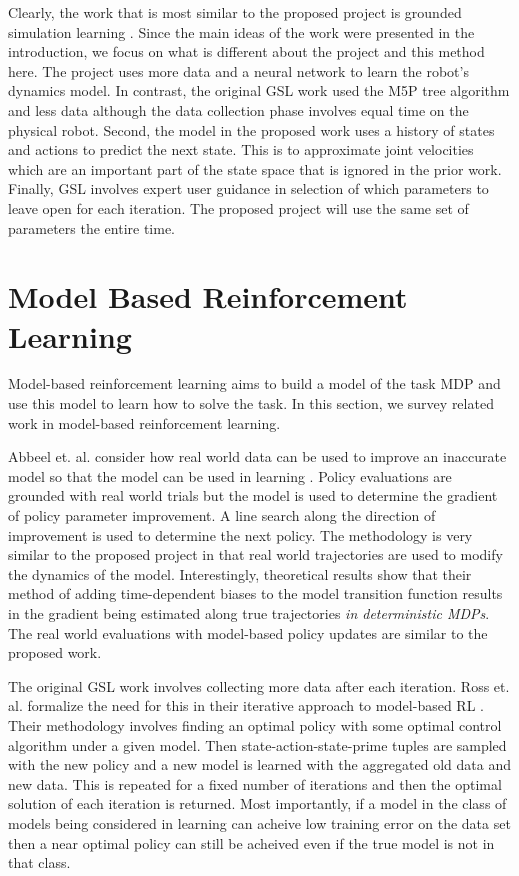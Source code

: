 \documentclass[12 pt]{article}
\begin{document}
Clearly, the work that is most similar to the proposed project is grounded simulation learning \cite{farchy2013humanoid}.
Since the main ideas of the work were presented in the introduction, we focus on what is different about the project and this method here. The project uses more data and a neural network to learn the robot's dynamics model. In contrast, the original GSL work used the M5P tree algorithm and less data although the data collection phase involves equal time on the physical robot. Second, the model in the proposed work uses a history of states and actions to predict the next state. This is to approximate joint velocities which are an important part of the state space that is ignored in the prior work. Finally, GSL involves expert user guidance in selection of which parameters to leave open for each iteration. The proposed project will use the same set of parameters the entire time.

\section{Model Based Reinforcement Learning}

Model-based reinforcement learning aims to build a model of the task MDP and use this model to learn how to solve the task. In this section, we survey related work in model-based reinforcement learning.

Abbeel et. al. consider how real world data can be used to improve an inaccurate model so that the model can be used in learning \cite{abbeel2006using}.
Policy evaluations are grounded with real world trials but the model is used to determine the gradient of policy parameter improvement.
A line search along the direction of improvement is used to determine the next policy.
The methodology is very similar to the proposed project in that real world trajectories are used to modify the dynamics of the model.
Interestingly, theoretical results show that their method of adding time-dependent biases to the model transition function results in the gradient being estimated along true trajectories \emph{in deterministic MDPs}. The real world evaluations with model-based policy updates are similar to the proposed work.

The original GSL work involves collecting more data after each iteration. Ross et. al. formalize the need for this in their iterative approach to model-based RL \cite{ross2012agnostic}. 
Their methodology involves finding an optimal policy with some optimal control algorithm under a given model. Then state-action-state-prime tuples are sampled with the new policy and a new model is learned with the aggregated old data and new data. This is repeated for a fixed number of iterations and then the optimal solution of each iteration is returned. Most importantly, if a model in the class of models being considered in learning can acheive low training error on the data set then a near optimal policy can still be acheived even if the true model is not in that class.
\end{document}
